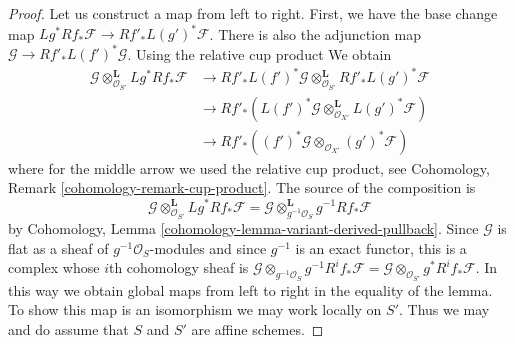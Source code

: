 \begin{proof}
Let us construct a map from left to right. First, we have the base change map
$Lg^*Rf_*\mathcal{F} \to Rf'_*L(g')^*\mathcal{F}$. There is also the adjunction
map $\mathcal{G} \to Rf'_*L(f')^*\mathcal{G}$. Using the relative cup product
We obtain
\begin{align*}
\mathcal{G}
\otimes_{\mathcal{O}_{S'}}^\mathbf{L}
Lg^*Rf_*\mathcal{F}
& \to
Rf'_*L(f')^*\mathcal{G}
\otimes_{\mathcal{O}_{S'}}^\mathbf{L}
Rf'_*L(g')^*\mathcal{F} \\
& \to
Rf'_*\left(L(f')^*\mathcal{G}
\otimes_{\mathcal{O}_{X'}}^\mathbf{L}
L(g')^*\mathcal{F}\right) \\
& \to
Rf'_*\left((f')^*\mathcal{G}
\otimes_{\mathcal{O}_{X'}} (g')^*\mathcal{F}\right)
\end{align*}
where for the middle arrow we used the relative cup product, see
Cohomology, Remark \ref{cohomology-remark-cup-product}.
The source of the composition is
$$
\mathcal{G} \otimes_{\mathcal{O}_{S'}}^\mathbf{L} Lg^*Rf_*\mathcal{F} =
\mathcal{G} \otimes_{g^{-1}\mathcal{O}_S}^\mathbf{L} g^{-1}Rf_*\mathcal{F}
$$
by Cohomology, Lemma \ref{cohomology-lemma-variant-derived-pullback}.
Since $\mathcal{G}$ is flat as a sheaf of $g^{-1}\mathcal{O}_S$-modules
and since $g^{-1}$ is an exact functor, this is a complex whose
$i$th cohomology sheaf is
$\mathcal{G} \otimes_{g^{-1}\mathcal{O}_S} g^{-1}R^if_*\mathcal{F} =
\mathcal{G} \otimes_{\mathcal{O}_{S'}} g^*R^if_*\mathcal{F}$.
In this way we obtain global maps from left to right in the
equality of the lemma. To show this map is an isomorphism we may
work locally on $S'$. Thus we may and do assume that $S$ and $S'$
are affine schemes.


\end{proof}
